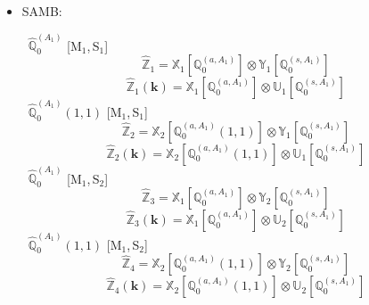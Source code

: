 \documentclass[fleqn,10pt,landscape]{article}
\begin{document}
\begin{itemize}
\item SAMB:

\vspace{4mm}
\noindent {} $\,\,\,\hat{\mathbb{Q}}_{0}^{(A_{1})}$ [M$_{1}$,\,S$_{1}$]
\begin{dmath*}
\hat{\mathbb{Z}}_{1}=\mathbb{X}_{1}[\mathbb{Q}_{0}^{(a,A_{1})}] \otimes\mathbb{Y}_{1}[\mathbb{Q}_{0}^{(s,A_{1})}]
\end{dmath*}
\begin{dmath*}
\hat{\mathbb{Z}}_{1}(\bm{k})=\mathbb{X}_{1}[\mathbb{Q}_{0}^{(a,A_{1})}] \otimes\mathbb{U}_{1}[\mathbb{Q}_{0}^{(s,A_{1})}]
\end{dmath*}
\vspace{4mm}
\noindent {} $\,\,\,\hat{\mathbb{Q}}_{0}^{(A_{1})}(1,1)$ [M$_{1}$,\,S$_{1}$]
\begin{dmath*}
\hat{\mathbb{Z}}_{2}=\mathbb{X}_{2}[\mathbb{Q}_{0}^{(a,A_{1})}(1,1)] \otimes\mathbb{Y}_{1}[\mathbb{Q}_{0}^{(s,A_{1})}]
\end{dmath*}
\begin{dmath*}
\hat{\mathbb{Z}}_{2}(\bm{k})=\mathbb{X}_{2}[\mathbb{Q}_{0}^{(a,A_{1})}(1,1)] \otimes\mathbb{U}_{1}[\mathbb{Q}_{0}^{(s,A_{1})}]
\end{dmath*}
\vspace{4mm}
\noindent {} $\,\,\,\hat{\mathbb{Q}}_{0}^{(A_{1})}$ [M$_{1}$,\,S$_{2}$]
\begin{dmath*}
\hat{\mathbb{Z}}_{3}=\mathbb{X}_{1}[\mathbb{Q}_{0}^{(a,A_{1})}] \otimes\mathbb{Y}_{2}[\mathbb{Q}_{0}^{(s,A_{1})}]
\end{dmath*}
\begin{dmath*}
\hat{\mathbb{Z}}_{3}(\bm{k})=\mathbb{X}_{1}[\mathbb{Q}_{0}^{(a,A_{1})}] \otimes\mathbb{U}_{2}[\mathbb{Q}_{0}^{(s,A_{1})}]
\end{dmath*}
\vspace{4mm}
\noindent {} $\,\,\,\hat{\mathbb{Q}}_{0}^{(A_{1})}(1,1)$ [M$_{1}$,\,S$_{2}$]
\begin{dmath*}
\hat{\mathbb{Z}}_{4}=\mathbb{X}_{2}[\mathbb{Q}_{0}^{(a,A_{1})}(1,1)] \otimes\mathbb{Y}_{2}[\mathbb{Q}_{0}^{(s,A_{1})}]
\end{dmath*}
\begin{dmath*}
\hat{\mathbb{Z}}_{4}(\bm{k})=\mathbb{X}_{2}[\mathbb{Q}_{0}^{(a,A_{1})}(1,1)] \otimes\mathbb{U}_{2}[\mathbb{Q}_{0}^{(s,A_{1})}]

\end{dmath*}
\end{itemize}
\end{document}
